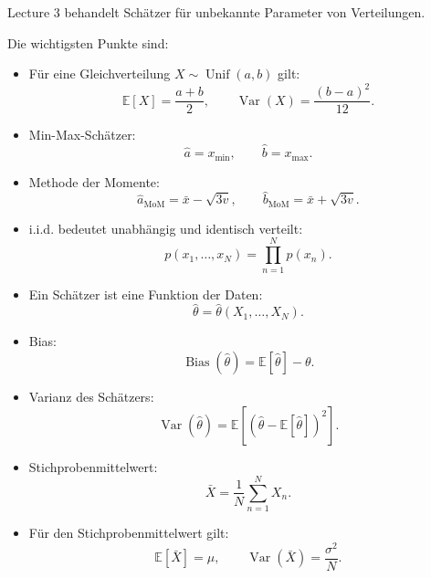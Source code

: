\documentclass[11pt,a4paper]{scrartcl}
\begin{document}
\begin{answerbox}
    Lecture 3 behandelt Schätzer für unbekannte Parameter von Verteilungen.

    Die wichtigsten Punkte sind:

    \begin{itemize}
        \item Für eine Gleichverteilung \(X \sim \operatorname{Unif}(a,b)\) gilt:
        \[
            \mathbb{E}[X]=\frac{a+b}{2},
            \qquad
            \operatorname{Var}(X)=\frac{(b-a)^2}{12}.
        \]

        \item Min-Max-Schätzer:
        \[
            \hat a = x_{\min},
            \qquad
            \hat b = x_{\max}.
        \]

        \item Methode der Momente:
        \[
            \hat a_{\mathrm{MoM}}
            =
            \bar x-\sqrt{3v},
            \qquad
            \hat b_{\mathrm{MoM}}
            =
            \bar x+\sqrt{3v}.
        \]

        \item i.i.d. bedeutet unabhängig und identisch verteilt:
        \[
            p(x_1,\dots,x_N)
            =
            \prod_{n=1}^{N}p(x_n).
        \]

        \item Ein Schätzer ist eine Funktion der Daten:
        \[
            \hat\theta
            =
            \hat\theta(X_1,\dots,X_N).
        \]

        \item Bias:
        \[
            \operatorname{Bias}(\hat\theta)
            =
            \mathbb{E}[\hat\theta]-\theta.
        \]

        \item Varianz des Schätzers:
        \[
            \operatorname{Var}(\hat\theta)
            =
            \mathbb{E}
            \left[
                \left(\hat\theta-\mathbb{E}[\hat\theta]\right)^2
            \right].
        \]

        \item Stichprobenmittelwert:
        \[
            \bar X
            =
            \frac{1}{N}
            \sum_{n=1}^{N}X_n.
        \]

        \item Für den Stichprobenmittelwert gilt:
        \[
            \mathbb{E}[\bar X]=\mu,
            \qquad
            \operatorname{Var}(\bar X)=\frac{\sigma^2}{N}.
        \]


\end{itemize}
\end{answerbox}
\end{document}
